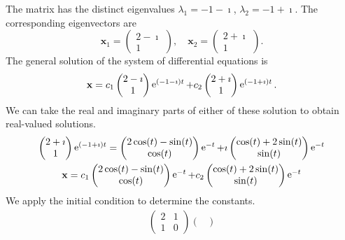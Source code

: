 \begin{Solution}
  The matrix has the distinct eigenvalues $\lambda_1 = -1 - \imath$, 
  $\lambda_2 = -1 + \imath$.  The corresponding eigenvectors are 
  \[
  \mathbf{x}_1 = \begin{pmatrix} 2 - \imath \\ 1 \end{pmatrix}, \quad
  \mathbf{x}_2 = \begin{pmatrix} 2 + \imath \\ 1 \end{pmatrix}.
  \]
  The general solution of the system of differential equations is
  \[
  \mathbf{x} = 
  c_1 \begin{pmatrix} 2 - \imath \\ 1 \end{pmatrix} \mathop{\mathrm{e}}\nolimits^{(-1-\imath)t}
  + c_2 \begin{pmatrix} 2 + \imath \\ 1 \end{pmatrix} \mathop{\mathrm{e}}\nolimits^{(-1+\imath)t}.
  \]
  We can take the real and imaginary parts of either of these solution to 
  obtain real-valued solutions.
  \begin{gather*}
    \begin{pmatrix} 2 + \imath \\ 1 \end{pmatrix} \mathop{\mathrm{e}}\nolimits^{(-1+\imath)t}
    = \begin{pmatrix} 2 \cos(t) - \sin(t) \\ \cos(t) \end{pmatrix} \mathop{\mathrm{e}}\nolimits^{-t}
    + \imath \begin{pmatrix} \cos(t) + 2 \sin(t) \\ \sin(t) \end{pmatrix} \mathop{\mathrm{e}}\nolimits^{-t} \\
    \mathbf{x} = 
    c_1 \begin{pmatrix} 2 \cos(t) - \sin(t) \\ \cos(t) \end{pmatrix} \mathop{\mathrm{e}}\nolimits^{-t}
    + c_2 \begin{pmatrix} \cos(t) + 2 \sin(t) \\ \sin(t) \end{pmatrix} \mathop{\mathrm{e}}\nolimits^{-t}
  \end{gather*}
  We apply the initial condition to determine the constants.
  \begin{gather*}
    \begin{pmatrix}
      2 & 1 \\
      1 & 0
    \end{pmatrix}
    \begin{pmatrix}

\end{pmatrix}
\end{gather*}
\end{Solution}

